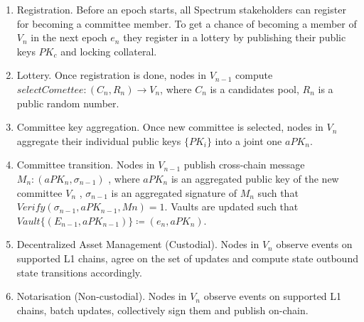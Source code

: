 \begin{enumerate}
    \item Registration.
    Before an epoch starts, all Spectrum stakeholders can register for becoming a committee member.
    To get a chance of becoming a member of $V_n$ in the next epoch $e_n$ they register in a lottery
    by publishing their public keys $PK_c$ and locking collateral.
    \item Lottery.
    Once registration is done, nodes in $V_{n-1}$ compute ${selectComettee: (C_n, R_n) \rightarrow V_n}$,
    where  $C_n$ is a candidates pool, $R_n$ is a public random number.
    \item Committee key aggregation.
    Once new committee is selected, nodes in $V_n$ aggregate their individual public keys $\{PK_i\}$ into
    a joint one $aPK_n$.
    \item Committee transition.
    Nodes in $V_{n-1}$ publish cross-chain message ${M_n : (aPK_n, \sigma_{n-1})}$ , where $aPK_n$ is
    an aggregated public key of the new committee $V_n$ , $\sigma_{n-1}$ is an aggregated signature of
    $M_n$ such that ${Verify(\sigma_{n-1}, aPK_{n-1}, Mn) = 1}$.
    Vaults are updated such that ${Vault\{(E_{n-1}, aPK_{n-1})\} \coloneqq (e_n, aPK_n)}$.
    \item Decentralized Asset Management (Custodial).
    Nodes in $V_n$ observe events on supported L1 chains, agree on the set of updates
    and compute state outbound state transitions accordingly.
    \item Notarisation (Non-custodial).
    Nodes in $V_n$ observe events on supported L1 chains, batch updates, collectively sign them and
    publish on-chain.
\end{enumerate}